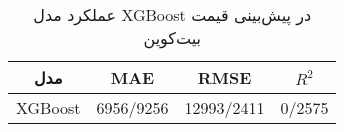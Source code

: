 
        \begin{table}[H]
            \centering
            \begin{tabular}{|c|c|c|c|}
                \hline
                \textbf{مدل} & \textbf{MAE} & \textbf{RMSE} & \textbf{ \(R^2\) } \\
				\hline
                XGBoost & 6956/9256 & 12993/2411 & 0/2575 \\
				\hline
            \end{tabular}
            \caption{عملکرد مدل XGBoost در پیش‌بینی قیمت بیت‌کوین}
            \label{tab:xgboost_performance}
        \end{table}
        